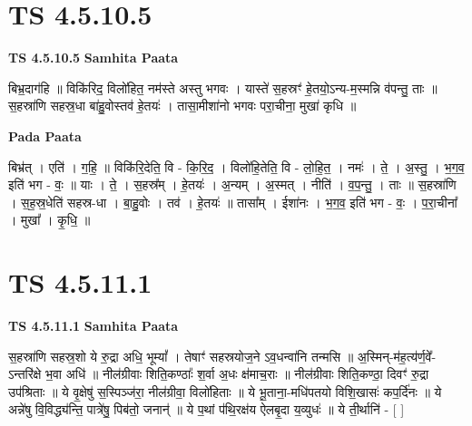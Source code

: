 \documentclass[17pt]{extarticle}
\begin{document}

\section{ TS 4.5.10.5 }

\textbf{TS 4.5.10.5 } \newline
\textbf{Samhita Paata} \newline

बिभ्र॒दाग॑हि ॥ विकि॑रिद॒ विलो॑हित॒ नम॑स्ते अस्तु भगवः । यास्ते॑ स॒हस्रꣳ॑ हे॒तयो॒ऽन्य-म॒स्मन्नि व॑पन्तु॒ ताः ॥                            स॒हस्रा॑णि सहस्र॒धा बा॑हु॒वोस्तव॑ हे॒तयः॑ । तासा॒मीशा॑नो भगवः परा॒चीना॒ मुखा॑ कृधि ॥ \newline

\textbf{Pada Paata} \newline

बिभ्र॑त् । एति॑ । ग॒हि॒ ॥ विकि॑रि॒देति॒ वि - कि॒रि॒द॒ । विलो॑हि॒तेति॒ वि - लो॒हि॒त॒ । नमः॑ । ते॒ । अ॒स्तु॒ । भ॒ग॒व॒ इति॑ भग - वः॒ ॥ याः । ते॒ । स॒हस्र᳚म् । हे॒तयः॑ । अ॒न्यम् । अ॒स्मत् । नीति॑ । व॒प॒न्तु॒ । ताः ॥ स॒हस्रा॑णि । स॒ह॒स्र॒धेति॑ सहस्र-धा । बा॒हु॒वोः । तव॑ । हे॒तयः॑ ॥ तासा᳚म् । ईशा॑नः । भ॒ग॒व॒ इति॑ भग - वः॒ । प॒रा॒चीना᳚ । मुखा᳚ । कृ॒धि॒ ॥  \newline





\section{ TS 4.5.11.1 }

\textbf{TS 4.5.11.1 } \newline
\textbf{Samhita Paata} \newline

स॒हस्रा॑णि सहस्र॒शो ये रु॒द्रा अधि॒ भूम्यां᳚ । तेषाꣳ॑ सहस्रयोज॒ने ऽव॒धन्वा॑नि तन्मसि ॥                                      अ॒स्मिन्-म॑ह॒त्य॑र्ण॒वे᳚-ऽन्तरि॑क्षे भ॒वा अधि॑ ॥                                     नील॑ग्रीवाः शिति॒कण्ठाः᳚ श॒र्वा अ॒धः क्ष॑माच॒राः ॥                                नील॑ग्रीवाः शिति॒कण्ठा॒ दिवꣳ॑ रु॒द्रा उप॑श्रिताः ॥                         ये वृ॒क्षेषु॑ स॒स्पिञ्ज॑रा॒ नील॑ग्रीवा॒ विलो॑हिताः ॥                                        ये भू॒ताना॒-मधि॑पतयो विशि॒खासः॑ कप॒र्दि॑नः ॥                                    ये अन्ने॑षु वि॒विद्ध्य॑न्ति॒ पात्रे॑षु॒ पिब॑तो॒ जनान्॑ ॥                                       ये प॒थां प॑थि॒रक्ष॑य ऐलबृ॒दा य॒व्युधः॑ ॥ ये ती॒र्थानि॑ - [  ] \newline
\end{document}
